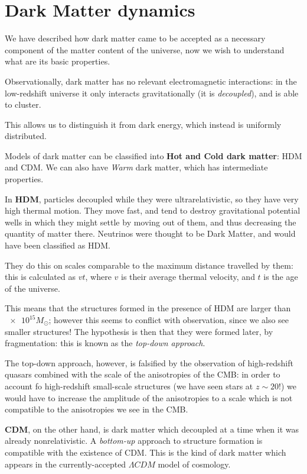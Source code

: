 \documentclass[main.tex]{subfiles}
\begin{document}
\section{Dark Matter dynamics}

We have described how dark matter came to be accepted as a necessary component of the matter content of the universe, now we wish to understand what are its basic properties. 

Observationally, dark matter has no relevant electromagnetic interactions: in the low-redshift universe it only interacts gravitationally (it is \emph{decoupled}), and is able to cluster.

This allows us to distinguish it from dark energy, which instead is uniformly distributed. 

Models of dark matter can be classified into \textbf{Hot and Cold dark matter}: HDM and CDM. 
We can also have \emph{Warm} dark matter, which has intermediate properties.

In \textbf{HDM}, particles decoupled while they were ultrarelativistic, so they have very high thermal motion.
They move fast, and tend to destroy gravitational potential wells in which they might settle by moving out of them, and thus decreasing the quantity of matter there. 
Neutrinos were thought to be Dark Matter, and would have been classified as HDM. 

They do this on scales comparable to the maximum distance travelled by them: this is calculated as \(vt\), where \(v\) is their average thermal velocity, and \(t\) is the age of the universe. 

This means that the structures formed in the presence of HDM are larger than \(\num{e15} M_{\odot}\); however this seems to conflict with observation, since we also see smaller structures!
The hypothesis is then that they were formed later, by fragmentation: this is known as the \emph{top-down approach}. 

The top-down approach, however, is falsified by the observation of high-redshift quasars combined with the scale of the anisotropies of the CMB: in order to account fo high-redshift small-scale structures (we have seen stars at \(z \sim 20\)!) we would have to increase the amplitude of the anisotropies to a scale which is not compatible to the anisotropies we see in the CMB. 

\textbf{CDM}, on the other hand, is dark matter which decoupled at a time when it was already nonrelativistic. 
A \emph{bottom-up} approach to structure formation is compatible with the existence of CDM.
This is the kind of dark matter which appears in the currently-accepted \(\Lambda CDM\) model of cosmology.
\end{document}
